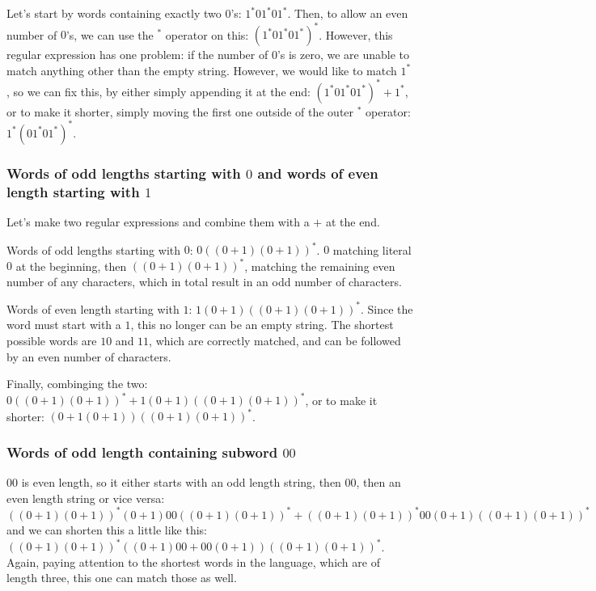 Let's start by words containing exactly two $0$'s: $1^*01^*01^*$. Then, to allow an even number of $0$'s, we can use the $^*$ operator on this: $(1^*01^*01^*)^*$. However, this regular expression has one problem: if the number of $0$'s is zero, we are unable to match anything other than the empty string. However, we would like to match $1^*$, so we can fix this, by either simply appending it at the end: $(1^*01^*01^*)^* + 1^*$, or to make it shorter, simply moving the first one outside of the outer $^*$ operator: $1^*(01^*01^*)^*$.

\subsubsection{Words of odd lengths starting with $0$ and words of even length starting with $1$}

Let's make two regular expressions and combine them with a $+$ at the end.

Words of odd lengths starting with $0$: $0((0+1)(0+1))^*$. $0$ matching literal $0$ at the beginning, then $((0+1)(0+1))^*$, matching the remaining even number of any characters, which in total result in an odd number of characters.

Words of even length starting with $1$: $1(0+1)((0+1)(0+1))^*$. Since the word must start with a $1$, this no longer can be an empty string. The shortest possible words are $10$ and $11$, which are correctly matched, and can be followed by an even number of characters.

Finally, combinging the two: $0((0+1)(0+1))^* + 1(0+1)((0+1)(0+1))^*$, or to make it shorter: $(0 + 1(0+1))((0+1)(0+1))^*$.

\subsubsection{Words of odd length containing subword $00$}

$00$ is even length, so it either starts with an odd length string, then $00$, then an even length string or vice versa: $((0+1)(0+1))^*(0+1)00((0+1)(0+1))^* + ((0+1)(0+1))^*00(0+1)((0+1)(0+1))^*$ and we can shorten this a little like this: $((0+1)(0+1))^*((0+1)00+00(0+1))((0+1)(0+1))^*$. Again, paying attention to the shortest words in the language, which are of length three, this one can match those as well.

